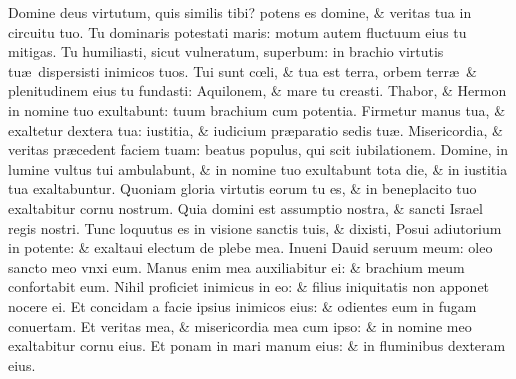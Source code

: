 \documentclass[a5paper,10pt]{book}
\def\ae{æ}
\def\oe{œ}
\begin{document}
\begin{multicols*}{2}
\newline \color{red} D\color{black}omine deus virtutum, quis similis tibi? potens es domine, \& veritas tua in circuitu tuo.
\newline \color{red} T\color{black}u dominaris potestati maris: motum autem fluctuum eius tu mitigas.
\newline \color{red} T\color{black}u humiliasti, sicut vulneratum, superbum: in brachio virtutis tu\ae \ dispersisti inimicos tuos.
\newline \color{red} T\color{black}ui sunt c\oe li, \& tua est terra, orbem terr\ae \ \& plenitudinem eius tu fundasti: Aquilonem, \& mare tu creasti.
\newline \color{red} T\color{black}habor, \& Hermon in nomine tuo exultabunt: tuum brachium cum potentia.
\newline \color{red} F\color{black}irmetur manus tua, \& exaltetur dextera tua: iustitia, \& iudicium pr\ae paratio sedis tu\ae .
\newline \color{red} M\color{black}isericordia, \& veritas pr\ae cedent faciem tuam: beatus populus, qui scit iubilationem.
\newline \color{red} D\color{black}omine, in lumine vultus tui ambulabunt, \& in nomine tuo exultabunt tota die, \& in iustitia tua exaltabuntur.
\newline \color{red} Q\color{black}uoniam gloria virtutis eorum tu es, \& in beneplacito tuo exaltabitur cornu nostrum.
\newline \color{red} Q\color{black}uia domini est assumptio nostra, \& sancti Israel regis nostri.
\newline \color{red} T\color{black}unc loquutus es in visione sanctis tuis, \& dixisti, Posui adiutorium in potente: \& exaltaui electum de plebe mea.
\newline \color{red} I\color{black}nueni Dauid seruum meum: oleo sancto meo vnxi eum.
\newline \color{red} M\color{black}anus enim mea auxiliabitur ei: \& brachium meum confortabit eum.
\newline \color{red} N\color{black}ihil proficiet inimicus in eo: \& filius iniquitatis non apponet nocere ei.
\newline \color{red} E\color{black}t concidam a facie ipsius inimicos eius: \& odientes eum in fugam conuertam.
\newline \color{red} E\color{black}t veritas mea, \& misericordia mea cum ipso: \& in nomine meo exaltabitur cornu eius.
\newline \color{red} E\color{black}t ponam in mari manum eius: \& in fluminibus dexteram eius.

\end{multicols*}
\end{document}
